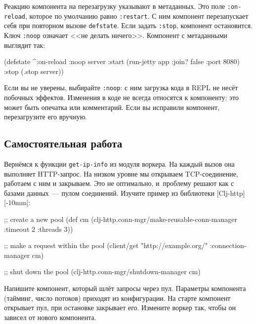 Реакцию компонента на перезагрузку указывают в метаданных. Это поле
\verb|:on-reload|, которое по умолчанию равно \verb|:restart|. С ним
компонент перезапускает себя при повторном вызове \verb|defstate|. Если задать
\verb|:stop|, компонент остановится. Ключ \verb|:noop| означает <<не делать
ничего>>. Компонент с метаданными выглядит так:

\begin{english}
  \begin{clojure}
(defstate
  ^{:on-reload :noop}
  server
  :start (run-jetty app {:join? false :port 8080})
  :stop (.stop server))
  \end{clojure}
\end{english}

Если вы не уверены, выбирайте \verb|:noop|: с ним загрузка кода в REPL не
несёт побочных эффектов. Изменения в коде не всегда относятся к компоненту: это
может быть опечатка или комментарий. Если вы исправили компонент, перезагрузите
его вручную.

\subsection{Самостоятельная работа}


Вернёмся к функции \verb|get-ip-info| из модуля воркера. На каждый вызов она
выполняет HTTP-запрос. На низком уровне мы открываем TCP-соединение, работаем с
ним и закрываем. Это не оптимально, и~проблему решают как с базами данных~---
пулом соединений. Изучите пример из библиотеки
[Clj-http][-10mm]:

\begin{english}
  \begin{clojure}
;; create a new pool
(def cm (clj-http.conn-mgr/make-reusable-conn-manager
         {:timeout 2 :threads 3}))

;; make a request within the pool
(client/get "http://example.org/"
            {:connection-manager cm})

;; shut down the pool
(clj-http.conn-mgr/shutdown-manager cm)
  \end{clojure}
\end{english}


Напишите компонент, который шлёт запросы через пул. Параметры компонента
(тайминг, число потоков) приходят из конфигурации. На старте компонент открывает
пул, при остановке закрывает его. Измените воркер так, чтобы он зависел от
нового компонента.

